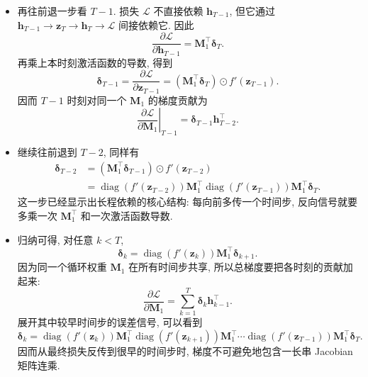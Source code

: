 \documentclass{../nndlcourse}
\begin{document}
\begin{enumerate}
\begin{itemize}
    \item 再往前退一步看 $T-1$. 损失 $\mathcal{L}$ 不直接依赖 $\boldsymbol{h}_{T-1}$, 但它通过
    $\boldsymbol{h}_{T-1}\to\boldsymbol{z}_T\to\boldsymbol{h}_T\to\mathcal{L}$ 间接依赖它. 因此
    \begin{equation*}
      \frac{\partial \mathcal{L}}{\partial \boldsymbol{h}_{T-1}}
      =
      \boldsymbol{M}_1^{\top}\boldsymbol{\delta}_T.
    \end{equation*}
    再乘上本时刻激活函数的导数, 得到
    \begin{equation*}
      \boldsymbol{\delta}_{T-1}
      =
      \frac{\partial \mathcal{L}}{\partial \boldsymbol{z}_{T-1}}
      =
      \left(\boldsymbol{M}_1^{\top}\boldsymbol{\delta}_T\right)
      \odot f'(\boldsymbol{z}_{T-1}).
    \end{equation*}
    因而 $T-1$ 时刻对同一个 $\boldsymbol{M}_1$ 的梯度贡献为
    \begin{equation*}
      \left.\frac{\partial \mathcal{L}}{\partial \boldsymbol{M}_1}\right|_{T-1}
      =
      \boldsymbol{\delta}_{T-1}\boldsymbol{h}_{T-2}^{\top}.
    \end{equation*}

    \item 继续往前退到 $T-2$, 同样有
    \begin{align*}
      \boldsymbol{\delta}_{T-2}
      &=
      \left(\boldsymbol{M}_1^{\top}\boldsymbol{\delta}_{T-1}\right)
      \odot f'(\boldsymbol{z}_{T-2}) \\
      &=
      \operatorname{diag}\left(f'(\boldsymbol{z}_{T-2})\right)
      \boldsymbol{M}_1^{\top}
      \operatorname{diag}\left(f'(\boldsymbol{z}_{T-1})\right)
      \boldsymbol{M}_1^{\top}\boldsymbol{\delta}_T.
    \end{align*}
    这一步已经显示出长程依赖的核心结构: 每向前多传一个时间步, 反向信号就要多乘一次 $\boldsymbol{M}_1^{\top}$ 和一次激活函数导数.

    \item 归纳可得, 对任意 $k<T$,
    \begin{equation*}
      \boldsymbol{\delta}_k
      =
      \operatorname{diag}\left(f'(\boldsymbol{z}_k)\right)
      \boldsymbol{M}_1^{\top}
      \boldsymbol{\delta}_{k+1}.
    \end{equation*}
    因为同一个循环权重 $\boldsymbol{M}_1$ 在所有时间步共享, 所以总梯度要把各时刻的贡献加起来:
    \begin{equation*}
      \frac{\partial \mathcal{L}}{\partial \boldsymbol{M}_1}
      =
      \sum_{k=1}^{T}
      \boldsymbol{\delta}_k\boldsymbol{h}_{k-1}^{\top}.
    \end{equation*}
    展开其中较早时间步的误差信号, 可以看到
    \begin{equation*}
      \boldsymbol{\delta}_k
      =
      \operatorname{diag}\left(f'(\boldsymbol{z}_k)\right)\boldsymbol{M}_1^{\top}
      \operatorname{diag}\left(f'(\boldsymbol{z}_{k+1})\right)\boldsymbol{M}_1^{\top}
      \cdots
      \operatorname{diag}\left(f'(\boldsymbol{z}_{T-1})\right)\boldsymbol{M}_1^{\top}
      \boldsymbol{\delta}_T.
    \end{equation*}
    因而从最终损失反传到很早的时间步时, 梯度不可避免地包含一长串 Jacobian 矩阵连乘.


\end{itemize}
\end{enumerate}
\end{document}
